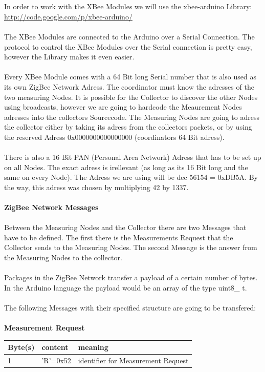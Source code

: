 \documentclass[
	11pt,
	a4paper
]{article}%
\begin{document}
\\\\
In order to work with the XBee Modules we will use the xbee-arduino Library:\\ \url{http://code.google.com/p/xbee-arduino/}
\\\\
The XBee Modules are connected to the Arduino over a Serial Connection. The protocol to control the XBee Modules over the Serial connection is pretty easy, however the Library makes it even easier.
\\\\
Every XBee Module comes with a 64 Bit long Serial number that is also used as its own ZigBee Network Adress. The coordinator must know the adresses of the two measuring Nodes. It is possible for the Collector to discover the other Nodes using broadcasts, however we are going to hardcode the Meaurement Nodes adresses into the collectors Sourcecode. The Measuring Nodes are going to adress the collector either by taking its adress from the collectors packets, or by using the reserved Adress 0x0000000000000000 (coordinators 64 Bit adress).
\\\\
There is also a 16 Bit PAN (Personal Area Network) Adress that has to be set up on all Nodes. The exact adress is irellevant (as long as its 16 Bit long and the same on every Node). The Adress we are using will be dec 56154 = 0xDB5A. By the way, this adress was chosen by multiplying 42 by 1337.
\\\\
\textbf{ZigBee Network Messages}
\\\\
Between the Measuring Nodes and the Collector there are two Messages that have to be defined. The first there is the Measurements Request that the Collector sends to the Measuring Nodes. The second Message is the answer from the Measuring Nodes to the collector.
\\\\
Packages in the ZigBee Network transfer a payload of a certain number of bytes. In the Arduino language the payload would be an array of the type uint8\_ t.
\\\\
The following Messages with their specified structure are going to be transfered:\\\\
\textbf{Measurement Request}
\begin{table}[h]
    \begin{tabular}{|l|l|l|}
    \hline
    \rowcolor{dunkelgrau}
    Byte(s) & content  & meaning                            \\ \hline
    1       & 'R'=0x52 & identifier for Measurement Request \\ \hline
    \end{tabular}
\end{table}\\
\end{document}
